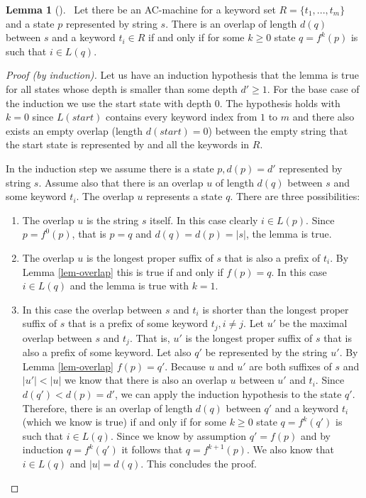 \documentclass[english,twoside,censored,csm,algorithms-track-2020]{HYthesisML}
\theoremstyle{plain}
\theoremstyle{definition}
\newtheorem{lemma}[theorem]{Lemma}
\numberwithin{testexample}{chapter}
\begin{document}


\begin{lemma}[] ~\label{lem-overlap-length}
  Let there be an AC-machine for a keyword set $R=\{t_1,...,t_m\}$ and a state $p$ represented
  by string $s$.
  There is an overlap of length $d(q)$ between $s$ and a keyword $t_i\in R$ if and only if
  for some $k \geq 0$ state $q=f^k(p)$ is such that $i\in L(q)$.
\end{lemma}
\begin{proof}[Proof (by induction)]
  Let us have an induction hypothesis that the lemma is true for all states whose depth is
  smaller than some depth $d'\geq 1$. For the base case of the induction we use the start state
  with depth 0. The hypothesis holds
  with $k=0$ since $L(start)$ contains every keyword index from $1$ to $m$ and there also exists an empty
  overlap (length $d(start)=0$) between the empty string that the start state is represented by and all
  the keywords in $R$.

  In the induction step we assume there is a state $p, d(p) = d'$ represented by string $s$.
  Assume also that there is an overlap $u$ of length $d(q)$ between $s$ and some keyword $t_i$. The
  overlap $u$ represents a state $q$.
  There are three possibilities:
  \begin{enumerate}[leftmargin=28pt]
  \item The overlap $u$ is the string $s$ itself. In this case clearly $i\in L(p)$. Since
    $p=f^0(p)$, that is $p=q$ and $d(q) = d(p) = |s|$, the lemma is true. 
  \item The overlap $u$ is the longest proper suffix of $s$ that is also a prefix of $t_i$.
    By Lemma \ref{lem-overlap} this is true if and only if $f(p) = q$. In this case
    $i\in L(q)$ and the lemma is true with $k=1$.
  \item In this case the overlap between $s$ and $t_i$ is shorter than the longest proper
    suffix of $s$ that is a prefix of some keyword $t_j, i\neq j$. Let $u'$ be the maximal
    overlap between $s$ and $t_j$. That is, $u'$ is the longest proper suffix of $s$ that is also
    a prefix of some keyword. Let also $q'$ be represented by the string $u'$. By Lemma
    \ref{lem-overlap} $f(p) = q'$. Because $u$ and $u'$ are both suffixes of $s$ and $|u'|<|u|$ we
    know that there is also an overlap $u$ between $u'$ and $t_i$. Since $d(q') < d(p) = d'$, we can
    apply the induction hypothesis to the state $q'$. Therefore, there is an overlap of length
    $d(q)$ between $q'$ and a keyword $t_i$ (which we know is true) if and only if for some
    $k \geq 0$ state $q=f^k(q')$ is such that $i\in L(q)$. Since we know by assumption $q'=f(p)$ and
    by induction $q=f^k(q')$ it follows that $q=f^{k+1}(p)$. We also know that $i\in L(q)$ and
    $|u|=d(q)$. This concludes the proof.
    

\end{enumerate}
\end{proof}
\end{document}
